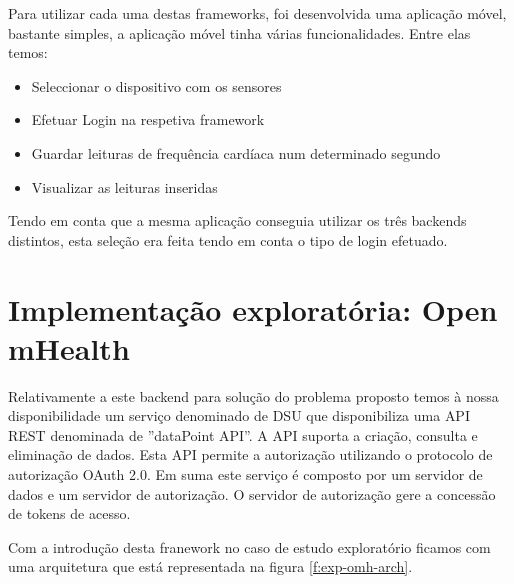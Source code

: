 Para utilizar cada uma destas frameworks, foi desenvolvida uma aplicação móvel, bastante simples, a aplicação móvel tinha várias funcionalidades. Entre elas temos:
\begin{itemize}
  \item Seleccionar o dispositivo com os sensores
  \item Efetuar Login na respetiva framework
  \item Guardar leituras de frequência cardíaca num determinado segundo
  \item Visualizar as leituras inseridas
\end{itemize}

Tendo em conta que a mesma aplicação conseguia utilizar os três backends distintos, esta seleção era feita tendo em conta o tipo de login efetuado.


\section{Implementação exploratória: Open mHealth}
\label{cap4:exp-omh}
Relativamente a este backend para solução do problema proposto temos à nossa disponibilidade um serviço denominado de \gls{DSU} que disponibiliza uma \gls{API} \gls{REST} denominada de ''dataPoint API''. A \gls{API} suporta a criação, consulta e eliminação de dados. Esta \gls{API} permite a autorização utilizando o protocolo de autorização OAuth 2.0. Em suma este serviço é composto por um servidor de dados e um servidor de autorização. O servidor de autorização gere a concessão de tokens de acesso. \cite{omhstorage} \par
Com a introdução desta franework no caso de estudo exploratório ficamos com uma arquitetura que está representada na figura \ref{f:exp-omh-arch}.

